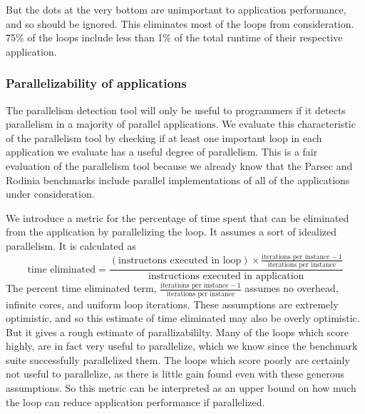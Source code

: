 \documentclass[12pt,twoside]{reedthesis}
\begin{document}
		But the dots at the very bottom are unimportant to application performance, and so should be ignored. This eliminates most of the loops from consideration. 75\% of the loops include less than 1\% of the total runtime of their respective application. 
		
		
		\subsubsection{Parallelizability of applications}
		
		The parallelism detection tool will only be useful to programmers if it detects parallelism in a  majority of parallel applications. We evaluate this characteristic of the parallelism tool by checking if at least one important loop in each application we evaluate has a useful degree of parallelism. This is a fair evaluation of the parallelism tool because we already know that the Parsec and Rodinia benchmarks include parallel implementations of all of the applications under consideration.%
		
		We introduce a metric for the percentage of time spent that can be eliminated from the application by parallelizing the loop. It assumes a sort of idealized parallelism. It is calculated as
		$$\text{time eliminated} = \frac{(\text{instructons executed in loop}) \times \frac{\text{iterations per instance} - 1}{\text{iterations per instance}}}{\text{instructions executed in application}} $$
		The percent time eliminated term, $\frac{\text{iterations per instance} - 1}{\text{iterations per instance}}$ assumes no overhead, infinite cores, and uniform loop iterations.
		These assumptions are extremely optimistic, and so this estimate of time eliminated may also be overly optimistic. But it gives a rough estimate of parallizabililty. Many of the loops which score highly, are in fact very useful to parallelize, which we know since the benchmark suite successfully parallelized them. The loops which score poorly are certainly not useful to parallelize, as there is little gain found even with these generous assumptions. 
		So this metric can be interpreted as an upper bound on how much the loop can reduce application performance if parallelized. 
		
\end{document}
